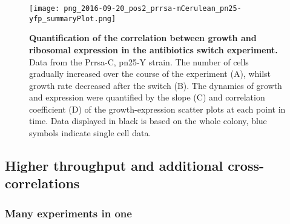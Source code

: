 \begin{figure}
    \begin{minipage}[c]{0.7\textwidth}
        \texttt{[image: png\_2016-09-20\_pos2\_prrsa-mCerulean\_pn25-yfp\_summaryPlot.png]}
    \end{minipage}\hfill
    \begin{minipage}[c]{0.3\textwidth}
        \caption{ 
            \textbf{Quantification of the correlation between growth and ribosomal expression in the antibiotics switch experiment.}
            Data from the Prrsa-C, pn25-Y strain. The number of cells gradually increased over the course of the experiment (A), whilst growth rate decreased after the switch (B).
            The dynamics of growth and expression were quantified by the slope (C) and correlation coefficient (D) of the growth-expression scatter plots at each point in time.
            Data displayed in black is based on the whole colony, blue symbols indicate single cell data.
        }
        \label{fig:ribo:switch5}
    \end{minipage}
\end{figure}



\subsection{Higher throughput and additional cross-correlations}

\subsubsection{Many experiments in one}


